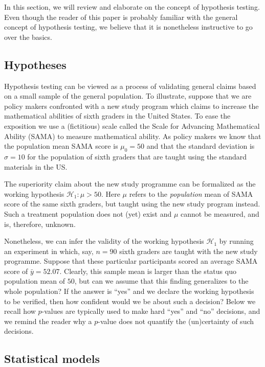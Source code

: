 \documentclass[english,,doc,floatsintext]{apa6}
\begin{document}
In this section, we will review and elaborate on the concept of hypothesis testing. Even though the reader of this paper is probably familiar with the general concept of hypothesis testing, we believe that it is nonetheless instructive to go over the basics.

\hypertarget{hypotheses}{%
\subsection{Hypotheses}\label{hypotheses}}

Hypothesis testing can be viewed as a process of validating general claims based on a small sample of the general population. To illustrate, suppose that we are policy makers confronted with a new study program which claims to increase the mathematical abilities of sixth graders in the United States. To ease the exposition we use a (fictitious) scale called the Scale for Advancing Mathematical Ability (SAMA) to measure mathematical ability. As policy makers we know that the population mean SAMA score is \(\mu_{0}=50\) and that the standard deviation is \(\sigma=10\) for the population of sixth graders that are taught using the standard materials in the US.

The superiority claim about the new study programme can be formalized as the working hypothesis \(\mathcal{H}_{1} : \mu > 50\). Here \(\mu\) refers to the \emph{population} mean of SAMA score of the same sixth graders, but taught using the new study program instead. Such a treatment population does not (yet) exist and \(\mu\) cannot be measured, and is, therefore, unknown.

Nonetheless, we can infer the validity of the working hypothesis \(\mathcal{H}_{1}\) by running an experiment in which, say, \(n=90\) sixth graders are taught with the new study programme. Suppose that these particular participants scored an average SAMA score of \(\bar{y} = 52.07\). Clearly, this sample mean is larger than the status quo population mean of \(50\), but can we assume that this finding generalizes to the whole population? If the answer is \enquote{yes} and we declare the working hypothesis to be verified, then how confident would we be about such a decision? Below we recall how \(p\)-values are typically used to make hard \enquote{yes} and \enquote{no} decisions, and we remind the reader why a \(p\)-value does not quantify the (un)certainty of such decisions.

\hypertarget{statistical-models}{%
\subsection{Statistical models}\label{statistical-models}}
\end{document}
